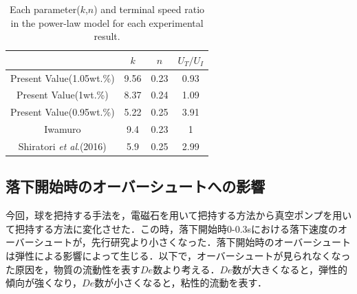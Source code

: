 \begin{table}[h]
    \centering
    \caption{Each parameter($k$,$n$) and terminal speed ratio in the power-law model for each experimental result.}
    \label{table:UT}
    \begin{tabular}{c|c|c|c} \hline
                                                     & $k$  & $n$  & $U_T/U_{I}$ \\ \hline \hline
        Present Value(1.05wt.\%)                     & 9.56 & 0.23 & 0.93        \\
        Present Value(1wt.\%)                        & 8.37 & 0.24 & 1.09        \\
        Present Value(0.95wt.\%)                     & 5.22 & 0.25 & 3.91        \\
        Iwamuro\cite{ref:8}                          & 9.4  & 0.23 & 1           \\
        Shiratori \textit{et al}.(2016)\cite{ref:10} & 5.9  & 0.25 & 2.99        \\ \hline
    \end{tabular}
\end{table}

\newpage

\subsection{落下開始時のオーバーシュートへの影響}
\label{sec:dis-de}

今回，球を把持する手法を，電磁石を用いて把持する方法から真空ポンプを用いて把持する方法に変化させた．この時，落下開始時0-0.3sにおける落下速度のオーバーシュートが，先行研究\cite{ref:8,ref:9}より小さくなった．落下開始時のオーバーシュートは弾性による影響によって生じる\cite{ref:12}．以下で，オーバーシュートが見られなくなった原因を，物質の流動性を表す$De$数より考える．$De$数が大きくなると，弾性的傾向が強くなり，$De$数が小さくなると，粘性的流動を表す．

